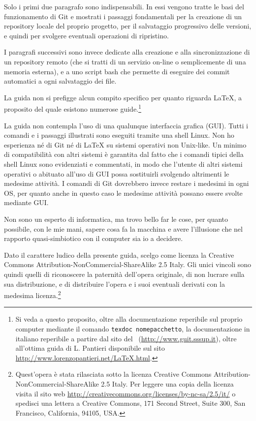 \documentclass[a4paper,12pt,oneside]{article}
\begin{document}
Solo i primi due paragrafo sono indispensabili. In essi vengono tratte le basi
del funzionamento di Git e  mostrati i passaggi fondamentali per la creazione di
un repository locale del proprio progetto, per il salvataggio progressivo delle
versioni, e quindi per svolgere eventuali operazioni di ripristino.

I paragrafi successivi sono invece dedicate alla creazione e alla
sincronizzazione di un repository remoto (che si tratti di un servizio on-line
o semplicemente di una memoria esterna), e a uno script bash che permette di
eseguire dei commit automatici a ogni salvataggio dei file.

La guida non si prefigge alcun compito specifico per quanto riguarda \LaTeX, a
proposito del quale esistono numerose guide.\footnote{Si veda a questo proposito,
  oltre alla documentazione reperibile sul proprio computer mediante il comando
  \lstinline|texdoc nomepacchetto|, la documentazione in italiano reperibile a
  partire dal sito del \guit\ (\url{http://www.guit.sssup.it}), oltre all'ottima guida
  di L. Pantieri disponibile sul sito
  \url{http://www.lorenzopantieri.net/LaTeX.html}.}

La guida non contempla l'uso di una qualunque interfaccia grafica (GUI). Tutti i
comandi e i passaggi illustrati sono eseguiti tramite una shell Linux.
Non ho esperienza né di Git né di \LaTeX{} su sistemi operativi non
Unix-like. Un minimo di compatibilità con altri sistemi è garantita dal fatto
che i comandi tipici della shell Linux sono evidenziati e commentati, in modo
che l'utente di altri sistemi operativi o abituato all'uso di GUI possa
sostituirli svolgendo altrimenti le medesime attività. I comandi di
Git dovrebbero invece restare i medesimi in ogni OS, per quanto anche in questo
caso le medesime attività possano essere svolte mediante GUI.

Non sono un esperto di informatica, ma trovo bello far le cose, per quanto
possibile, con le mie mani, sapere cosa fa la macchina e avere l'illusione che
nel rapporto quasi-simbiotico con il computer sia io a decidere.

Dato il carattere ludico della presente guida, scelgo come licenza la Creative
Commons Attribution-NonCommercial-ShareAlike 2.5 Italy. Gli unici vincoli sono
quindi quelli di riconoscere la paternità dell'opera
originale, di non lucrare sulla sua distribuzione, e di distribuire l'opera e
i suoi eventuali derivati con la medesima licenza.\footnote{
  Quest'opera è stata rilasciata sotto la licenza
  Creative Commons Attribution-NonCommercial-ShareAlike 2.5 Italy.
  Per leggere una copia della licenza visita il sito web
  \url{http://creativecommons.org/licenses/by-nc-sa/2.5/it/}
  o spedisci una lettera a Creative Commons, 171 Second Street, Suite 300, San
  Francisco, California, 94105, USA.}
\end{document}
